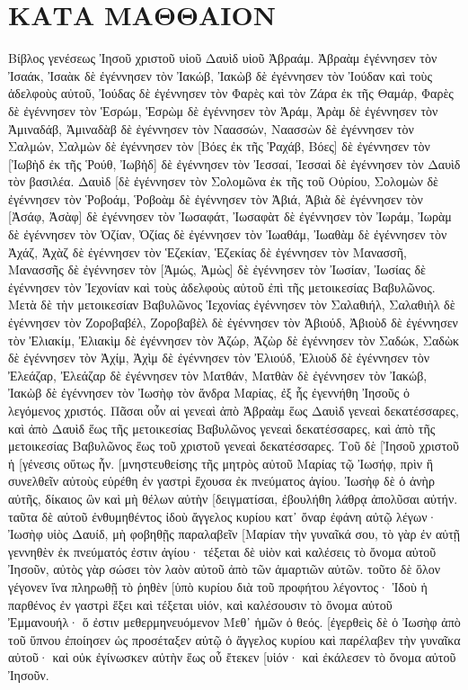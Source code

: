 \section{ΚΑΤΑ ΜΑΘΘΑΙΟΝ}
Βίβλος γενέσεως Ἰησοῦ χριστοῦ υἱοῦ Δαυὶδ υἱοῦ Ἀβραάμ. 
Ἀβραὰμ ἐγέννησεν τὸν Ἰσαάκ, Ἰσαὰκ δὲ ἐγέννησεν τὸν Ἰακώβ, Ἰακὼβ δὲ ἐγέννησεν τὸν Ἰούδαν καὶ τοὺς ἀδελφοὺς αὐτοῦ, 
Ἰούδας δὲ ἐγέννησεν τὸν Φαρὲς καὶ τὸν Ζάρα ἐκ τῆς Θαμάρ, Φαρὲς δὲ ἐγέννησεν τὸν Ἑσρώμ, Ἑσρὼμ δὲ ἐγέννησεν τὸν Ἀράμ, 
Ἀρὰμ δὲ ἐγέννησεν τὸν Ἀμιναδάβ, Ἀμιναδὰβ δὲ ἐγέννησεν τὸν Ναασσών, Ναασσὼν δὲ ἐγέννησεν τὸν Σαλμών, 
Σαλμὼν δὲ ἐγέννησεν τὸν [Βόες ἐκ τῆς Ῥαχάβ, Βόες] δὲ ἐγέννησεν τὸν [Ἰωβὴδ ἐκ τῆς Ῥούθ, Ἰωβὴδ] δὲ ἐγέννησεν τὸν Ἰεσσαί, 
Ἰεσσαὶ δὲ ἐγέννησεν τὸν Δαυὶδ τὸν βασιλέα. Δαυὶδ [δὲ ἐγέννησεν τὸν Σολομῶνα ἐκ τῆς τοῦ Οὐρίου, 
Σολομὼν δὲ ἐγέννησεν τὸν Ῥοβοάμ, Ῥοβοὰμ δὲ ἐγέννησεν τὸν Ἀβιά, Ἀβιὰ δὲ ἐγέννησεν τὸν [Ἀσάφ, 
Ἀσὰφ] δὲ ἐγέννησεν τὸν Ἰωσαφάτ, Ἰωσαφὰτ δὲ ἐγέννησεν τὸν Ἰωράμ, Ἰωρὰμ δὲ ἐγέννησεν τὸν Ὀζίαν, 
Ὀζίας δὲ ἐγέννησεν τὸν Ἰωαθάμ, Ἰωαθὰμ δὲ ἐγέννησεν τὸν Ἀχάζ, Ἀχὰζ δὲ ἐγέννησεν τὸν Ἑζεκίαν, 
Ἑζεκίας δὲ ἐγέννησεν τὸν Μανασσῆ, Μανασσῆς δὲ ἐγέννησεν τὸν [Ἀμώς, Ἀμὼς] δὲ ἐγέννησεν τὸν Ἰωσίαν, 
Ἰωσίας δὲ ἐγέννησεν τὸν Ἰεχονίαν καὶ τοὺς ἀδελφοὺς αὐτοῦ ἐπὶ τῆς μετοικεσίας Βαβυλῶνος. 
Μετὰ δὲ τὴν μετοικεσίαν Βαβυλῶνος Ἰεχονίας ἐγέννησεν τὸν Σαλαθιήλ, Σαλαθιὴλ δὲ ἐγέννησεν τὸν Ζοροβαβέλ, 
Ζοροβαβὲλ δὲ ἐγέννησεν τὸν Ἀβιούδ, Ἀβιοὺδ δὲ ἐγέννησεν τὸν Ἐλιακίμ, Ἐλιακὶμ δὲ ἐγέννησεν τὸν Ἀζώρ, 
Ἀζὼρ δὲ ἐγέννησεν τὸν Σαδώκ, Σαδὼκ δὲ ἐγέννησεν τὸν Ἀχίμ, Ἀχὶμ δὲ ἐγέννησεν τὸν Ἐλιούδ, 
Ἐλιοὺδ δὲ ἐγέννησεν τὸν Ἐλεάζαρ, Ἐλεάζαρ δὲ ἐγέννησεν τὸν Ματθάν, Ματθὰν δὲ ἐγέννησεν τὸν Ἰακώβ, 
Ἰακὼβ δὲ ἐγέννησεν τὸν Ἰωσὴφ τὸν ἄνδρα Μαρίας, ἐξ ἧς ἐγεννήθη Ἰησοῦς ὁ λεγόμενος χριστός. 
Πᾶσαι οὖν αἱ γενεαὶ ἀπὸ Ἀβραὰμ ἕως Δαυὶδ γενεαὶ δεκατέσσαρες, καὶ ἀπὸ Δαυὶδ ἕως τῆς μετοικεσίας Βαβυλῶνος γενεαὶ δεκατέσσαρες, καὶ ἀπὸ τῆς μετοικεσίας Βαβυλῶνος ἕως τοῦ χριστοῦ γενεαὶ δεκατέσσαρες. 
Τοῦ δὲ [Ἰησοῦ χριστοῦ ἡ [γένεσις οὕτως ἦν. [μνηστευθείσης τῆς μητρὸς αὐτοῦ Μαρίας τῷ Ἰωσήφ, πρὶν ἢ συνελθεῖν αὐτοὺς εὑρέθη ἐν γαστρὶ ἔχουσα ἐκ πνεύματος ἁγίου. 
Ἰωσὴφ δὲ ὁ ἀνὴρ αὐτῆς, δίκαιος ὢν καὶ μὴ θέλων αὐτὴν [δειγματίσαι, ἐβουλήθη λάθρᾳ ἀπολῦσαι αὐτήν. 
ταῦτα δὲ αὐτοῦ ἐνθυμηθέντος ἰδοὺ ἄγγελος κυρίου κατ᾽ ὄναρ ἐφάνη αὐτῷ λέγων· Ἰωσὴφ υἱὸς Δαυίδ, μὴ φοβηθῇς παραλαβεῖν [Μαρίαν τὴν γυναῖκά σου, τὸ γὰρ ἐν αὐτῇ γεννηθὲν ἐκ πνεύματός ἐστιν ἁγίου· 
τέξεται δὲ υἱὸν καὶ καλέσεις τὸ ὄνομα αὐτοῦ Ἰησοῦν, αὐτὸς γὰρ σώσει τὸν λαὸν αὐτοῦ ἀπὸ τῶν ἁμαρτιῶν αὐτῶν. 
τοῦτο δὲ ὅλον γέγονεν ἵνα πληρωθῇ τὸ ῥηθὲν [ὑπὸ κυρίου διὰ τοῦ προφήτου λέγοντος· 
Ἰδοὺ ἡ παρθένος ἐν γαστρὶ ἕξει καὶ τέξεται υἱόν, καὶ καλέσουσιν τὸ ὄνομα αὐτοῦ Ἐμμανουήλ· ὅ ἐστιν μεθερμηνευόμενον Μεθ᾽ ἡμῶν ὁ θεός. 
[ἐγερθεὶς δὲ ὁ Ἰωσὴφ ἀπὸ τοῦ ὕπνου ἐποίησεν ὡς προσέταξεν αὐτῷ ὁ ἄγγελος κυρίου καὶ παρέλαβεν τὴν γυναῖκα αὐτοῦ· 
καὶ οὐκ ἐγίνωσκεν αὐτὴν ἕως οὗ ἔτεκεν [υἱόν· καὶ ἐκάλεσεν τὸ ὄνομα αὐτοῦ Ἰησοῦν. 
